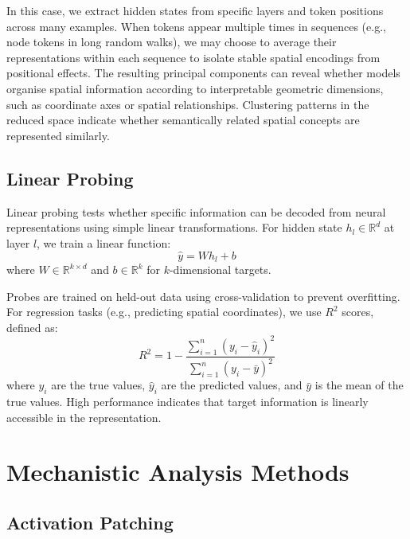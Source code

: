 In this case, we extract hidden states from specific layers and token positions across many examples. When tokens appear multiple times in sequences (e.g., node tokens in long random walks), we may choose to average their representations within each sequence to isolate stable spatial encodings from positional effects. The resulting principal components can reveal whether models organise spatial information according to interpretable geometric dimensions, such as coordinate axes or spatial relationships. Clustering patterns in the reduced space indicate whether semantically related spatial concepts are represented similarly.


\subsection{Linear Probing}

Linear probing tests whether specific information can be decoded from neural representations using simple linear transformations. For hidden state $h_l \in \mathbb{R}^d$ at layer $l$, we train a linear function:
\begin{equation}
\hat{y} = Wh_l + b
\end{equation}
where $W \in \mathbb{R}^{k \times d}$ and $b \in \mathbb{R}^k$ for $k$-dimensional targets.

Probes are trained on held-out data using cross-validation to prevent overfitting. For regression tasks (e.g., predicting spatial coordinates), we use $R^2$ scores, defined as:
\begin{equation}
R^2 = 1 - \frac{\sum_{i=1}^{n} (y_i - \hat{y}_i)^2}{\sum_{i=1}^{n} (y_i - \bar{y})^2}
\end{equation}
where $y_i$ are the true values, $\hat{y}_i$ are the predicted values, and $\bar{y}$ is the mean of the true values. High performance indicates that target information is linearly accessible in the representation.

\section{Mechanistic Analysis Methods}

\subsection{Activation Patching}

